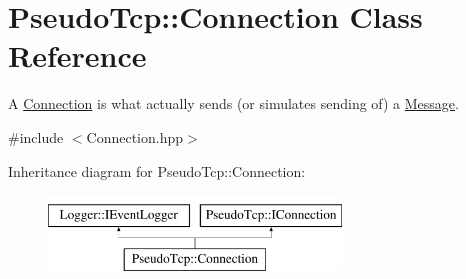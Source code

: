 \hypertarget{classPseudoTcp_1_1Connection}{
\section{PseudoTcp::Connection Class Reference}
\label{classPseudoTcp_1_1Connection}
}


A \hyperlink{classPseudoTcp_1_1Connection}{Connection} is what actually sends (or simulates sending of) a \hyperlink{classPseudoTcp_1_1Message}{Message}.  




{\ttfamily \#include $<$Connection.hpp$>$}

Inheritance diagram for PseudoTcp::Connection:\begin{figure}[H]
\begin{center}
\leavevmode
\includegraphics[height=2cm]{classPseudoTcp_1_1Connection}
\end{center}
\end{figure}
